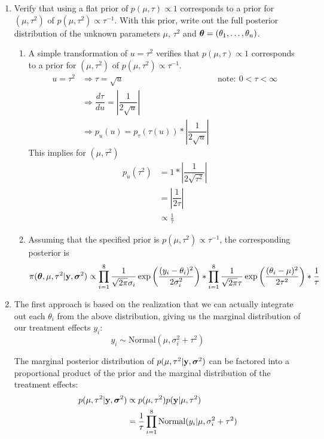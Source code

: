 \documentclass[12pt]{article}
\def\y{\mathbf{y}}
\newcommand{\si}{\mbox{\boldmath $\sigma$}}
\newcommand{\bth}{\mbox{\boldmath $\theta$}}
\begin{document}
\begin{enumerate}
	{\leftmargin=1em}
	
	\item Verify that using a flat prior of $p(\mu,\tau)\propto 1$ corresponds to a prior for $(\mu,\tau^2)$ of $p(\mu,\tau^2) \propto \tau^{-1}$. With this prior, write out the full posterior distribution of the unknown parameters $\mu$, $\tau^2$ and $\bth=(\theta_1,\ldots,\theta_n)$. 
	\begin{enumerate}
		\item A simple transformation of $u=\tau^2$ verifies that $p(\mu,\tau)\propto 1$ corresponds to a prior for $(\mu,\tau^2)$ of $p(\mu,\tau^2) \propto \tau^{-1}$. 
		\begin{align*}
			u = \tau^2 &\Rightarrow \tau=\sqrt{u} & \mathrm{note: } \ 0<\tau<\infty \\
			&\Rightarrow \dfrac{d\tau}{d u} = |\dfrac{1}{2 \sqrt{u}}| \\
			&\Rightarrow p_u (u) = p_\tau (\tau(u)) * |\dfrac{1}{2 \sqrt{u}}| \ 
		\end{align*}
		This implies for $(\mu,\tau^2)$ 
		\begin{align*}
			p_u (\tau^2) & = 1 * |\dfrac{1}{2 \sqrt{\tau^2}}| \\
			& = |\dfrac{1}{2 \tau } | \\
			& \propto \frac{1}{\tau} 
		\end{align*}
		
		\item Assuming that the specified prior is $p(\mu,\tau^2) \propto \tau^{-1}$, the corresponding posterior is
		\[
			\pi(\bth, \mu, \tau^2 | \mathbf{y}, \si^2) \propto \prod_{i=1}^8  \frac{1}{\sqrt{2\pi} \sigma_{i}} \exp \left( \frac{(y_i - \theta_i)^2}{2\sigma_{i}^2} \right) 
			* \prod_{i=1}^8 \frac{1}{\sqrt{2\pi} \tau} \exp\left(\frac{(\theta_i - \mu)^2}{2\tau^2} \right) * \frac{1}{\tau} 
		\]
	\end{enumerate}


	\item The first approach is based on the realization that we can actually integrate out each $\theta_i$ from the above distribution, giving us the marginal distribution of our treatment effects $y_i$: $$ y_i \sim \mbox{Normal}(\mu,\sigma^2_i+\tau^2) $$ 
	
	The marginal posterior distribution of $p(\mu,\tau^2|\y,\si^2)$ can be factored into a proportional product of the prior and the marginal distribution of the treatment effects:
		\begin{align*}
			p(\mu,\tau^2|\y, \si^2) & \propto p(\mu,\tau^2) p(\y | \mu,\tau^2) \\
			& = \frac{1}{\tau} \prod_{i=1}^8 \mbox{Normal}(y_i | \mu, \sigma_{i}^2 + \tau^2)
		\end{align*}
	

\end{enumerate}
\end{document}
